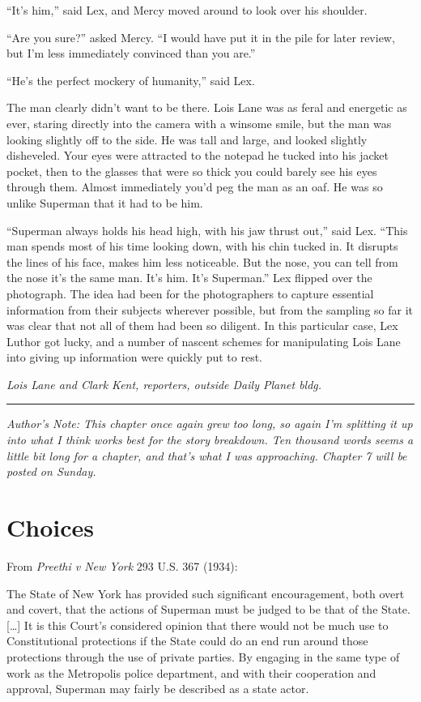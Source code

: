 \documentclass[ebook,12pt]{memoir}
\begin{document}
``It's him,'' said Lex, and Mercy moved around to look over his
shoulder.

``Are you sure?'' asked Mercy. ``I would have put it in the pile for
later review, but I'm less immediately convinced than you are.''

``He's the perfect mockery of humanity,'' said Lex.

The man clearly didn't want to be there. Lois Lane was as feral and
energetic as ever, staring directly into the camera with a winsome
smile, but the man was looking slightly off to the side. He was tall and
large, and looked slightly disheveled. Your eyes were attracted to the
notepad he tucked into his jacket pocket, then to the glasses that were
so thick you could barely see his eyes through them. Almost immediately
you'd peg the man as an oaf. He was so unlike Superman that it had to be
him.

``Superman always holds his head high, with his jaw thrust out,'' said
Lex. ``This man spends most of his time looking down, with his chin
tucked in. It disrupts the lines of his face, makes him less noticeable.
But the nose, you can tell from the nose it's the same man. It's him.
It's Superman.'' Lex flipped over the photograph. The idea had been for
the photographers to capture essential information from their subjects
wherever possible, but from the sampling so far it was clear that not
all of them had been so diligent. In this particular case, Lex Luthor
got lucky, and a number of nascent schemes for manipulating Lois Lane
into giving up information were quickly put to rest.

\emph{Lois Lane and Clark Kent, reporters, outside Daily Planet bldg.}

\begin{center}\rule{0.5\linewidth}{\linethickness}\end{center}

\emph{Author's Note: This chapter once again grew too long, so again I'm
splitting it up into what I think works best for the story breakdown.
Ten thousand words seems a little bit long for a chapter, and that's
what I was approaching. Chapter 7 will be posted on Sunday.}
\chapter{Choices}\label{choices}

From \emph{Preethi v New York} 293 U.S. 367 (1934):

The State of New York has provided such significant encouragement, both
overt and covert, that the actions of Superman must be judged to be that
of the State. {{[}}\ldots{}{{]}} It is this Court's considered opinion
that there would not be much use to Constitutional protections if the
State could do an end run around those protections through the use of
private parties. By engaging in the same type of work as the Metropolis
police department, and with their cooperation and approval, Superman may
fairly be described as a state actor.
\end{document}
